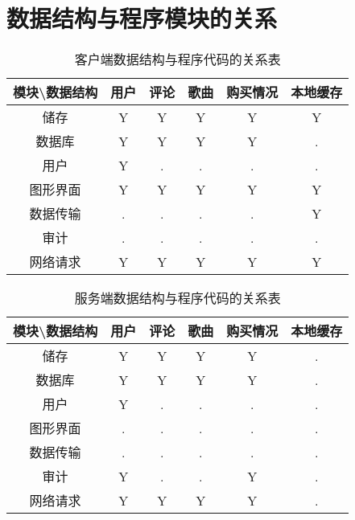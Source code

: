 \section{数据结构与程序模块的关系}
\begin{table}[htbp]
\centering
\caption{客户端数据结构与程序代码的关系表} \label{tab:datastructure-module-client}
\begin{tabular}{|c|c|c|c|c|c|}
    \hline
    模块\backslash 数据结构 & 用户 & 评论 & 歌曲 & 购买情况 & 本地缓存 \\
    \hline
    储存 & Y & Y & Y & Y & Y \\
    \hline
    数据库 & Y & Y & Y & Y & . \\
    \hline
    用户 & Y & . & . & . & . \\
    \hline
    图形界面 & Y & Y & Y & Y & Y \\
    \hline
    数据传输 & . & . & . & . & Y \\
    \hline
    审计 & . & . & . & . & . \\
    \hline
    网络请求 & Y & Y & Y & Y & Y \\
    \hline
\end{tabular}
\end{table}

\begin{table}[htbp]
    \centering
    \caption{服务端数据结构与程序代码的关系表} \label{tab:datastructure-module-server}
    \begin{tabular}{|c|c|c|c|c|c|}
        \hline
        模块\backslash 数据结构 & 用户 & 评论 & 歌曲 & 购买情况 & 本地缓存 \\
        \hline
        储存 & Y & Y & Y & Y & . \\
        \hline
        数据库 & Y & Y & Y & Y & . \\
        \hline
        用户 & Y & . & . & . & . \\
        \hline
        图形界面 & . & . & . & . & . \\
        \hline
        数据传输 & . & . & . & . & . \\
        \hline
        审计 & Y & . & . & Y & . \\
        \hline
        网络请求 & Y & Y & Y & Y & . \\
        \hline
    \end{tabular}
    \end{table}